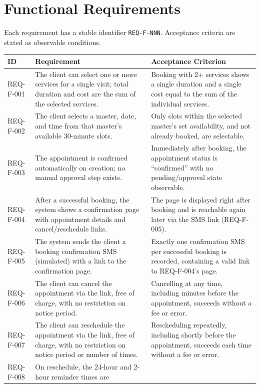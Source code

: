 \documentclass[11pt,a4paper]{article}
\begin{document}
\section{Functional Requirements}
\label{sec:functional}

Each requirement has a stable identifier \texttt{REQ-F-NNN}. Acceptance
criteria are stated as observable conditions.

\begin{longtable}{L{1.9cm}L{6.4cm}L{6.2cm}}
\toprule
ID & Requirement & Acceptance Criterion \\
\midrule
\endhead
REQ-F-001 & The client can select one or more services for a single visit;
  total duration and cost are the sum of the selected services. &
  Booking with 2+ services shows a single duration and a single cost equal
  to the sum of the individual services. \\
REQ-F-002 & The client selects a master, date, and time from that master's
  available 30-minute slots. & Only slots within the selected master's set
  availability, and not already booked, are selectable. \\
REQ-F-003 & The appointment is confirmed automatically on creation; no
  manual approval step exists. & Immediately after booking, the appointment
  status is ``confirmed'' with no pending/approval state observable. \\
REQ-F-004 & After a successful booking, the system shows a confirmation
  page with appointment details and cancel/reschedule links. & The page is
  displayed right after booking and is reachable again later via the SMS
  link (REQ-F-005). \\
REQ-F-005 & The system sends the client a booking confirmation SMS
  (simulated) with a link to the confirmation page. & Exactly one
  confirmation SMS per successful booking is recorded, containing a valid
  link to REQ-F-004's page. \\
REQ-F-006 & The client can cancel the appointment via the link, free of
  charge, with no restriction on notice period. & Cancelling at any time,
  including minutes before the appointment, succeeds without a fee or
  error. \\
REQ-F-007 & The client can reschedule the appointment via the link, free of
  charge, with no restriction on notice period or number of times. &
  Rescheduling repeatedly, including shortly before the appointment,
  succeeds each time without a fee or error. \\
REQ-F-008 & On reschedule, the 24-hour and 2-hour reminder times are

\end{longtable}
\end{document}
